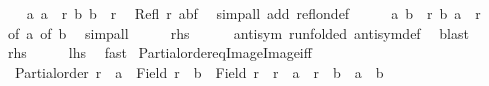 \begin{isabellebody}
\ \ \isamarkupfalse%
\ {\isachardoublequoteopen}{\isacharparenleft}{\kern0pt}a{\isacharcomma}{\kern0pt}\ a{\isacharparenright}{\kern0pt}\ {\isasymin}\ r{\isachardoublequoteclose}\ {\isachardoublequoteopen}{\isacharparenleft}{\kern0pt}b{\isacharcomma}{\kern0pt}\ b{\isacharparenright}{\kern0pt}\ {\isasymin}\ r{\isachardoublequoteclose}\ \isamarkupfalse%
\ {\isacartoucheopen}Refl\ r{\isacartoucheclose}\ abf\ \isamarkupfalse%
\ {\isacharparenleft}{\kern0pt}simp{\isacharunderscore}{\kern0pt}all\ add{\isacharcolon}{\kern0pt}\ refl{\isacharunderscore}{\kern0pt}on{\isacharunderscore}{\kern0pt}def{\isacharparenright}{\kern0pt}\isanewline
\ \ \isamarkupfalse%
\ \isamarkupfalse%
\ {\isachardoublequoteopen}{\isacharparenleft}{\kern0pt}a{\isacharcomma}{\kern0pt}\ b{\isacharparenright}{\kern0pt}\ {\isasymin}\ r{\isachardoublequoteclose}\ {\isachardoublequoteopen}{\isacharparenleft}{\kern0pt}b{\isacharcomma}{\kern0pt}\ a{\isacharparenright}{\kern0pt}\ {\isasymin}\ r{\isachardoublequoteclose}\ \isamarkupfalse%
\ {\isacharasterisk}{\kern0pt}{\isacharbrackleft}{\kern0pt}of\ a{\isacharbrackright}{\kern0pt}\ {\isacharasterisk}{\kern0pt}{\isacharbrackleft}{\kern0pt}of\ b{\isacharbrackright}{\kern0pt}\ \isamarkupfalse%
\ simp{\isacharunderscore}{\kern0pt}all\isanewline
\ \ \isamarkupfalse%
\ \isamarkupfalse%
\ {\isacharquery}{\kern0pt}rhs\isanewline
\ \ \ \ \isamarkupfalse%
\ {\isacartoucheopen}antisym\ r{\isacartoucheclose}{\isacharbrackleft}{\kern0pt}unfolded\ antisym{\isacharunderscore}{\kern0pt}def{\isacharbrackright}{\kern0pt}\ \isamarkupfalse%
\ blast\isanewline
{}\isamarkupfalse%
\isanewline
\ \ \isamarkupfalse%
\ {\isacharquery}{\kern0pt}rhs\isanewline
\ \ \isamarkupfalse%
\ \isamarkupfalse%
\ {\isacharquery}{\kern0pt}lhs\ \isamarkupfalse%
\ fast\isanewline
{}\isamarkupfalse%
%
\endisatagproof
{\isafoldproof}%
%
\isadelimproof
\isanewline
%
\endisadelimproof
\isanewline
{}\isamarkupfalse%
\ Partial{\isacharunderscore}{\kern0pt}order{\isacharunderscore}{\kern0pt}eq{\isacharunderscore}{\kern0pt}Image{}{\isacharunderscore}{\kern0pt}Image{}{\isacharunderscore}{\kern0pt}iff{\isacharcolon}{\kern0pt}\isanewline
\ \ {\isachardoublequoteopen}Partial{\isacharunderscore}{\kern0pt}order\ r\ {\isasymLongrightarrow}\ a\ {\isasymin}\ Field\ r\ {\isasymLongrightarrow}\ b\ {\isasymin}\ Field\ r\ {\isasymLongrightarrow}\ r\ {\isacharbackquote}{\kern0pt}{\isacharbackquote}{\kern0pt}\ {\isacharbraceleft}{\kern0pt}a{\isacharbraceright}{\kern0pt}\ {\isacharequal}{\kern0pt}\ r\ {\isacharbackquote}{\kern0pt}{\isacharbackquote}{\kern0pt}\ {\isacharbraceleft}{\kern0pt}b{\isacharbraceright}{\kern0pt}\ {\isasymlongleftrightarrow}\ a\ {\isacharequal}{\kern0pt}\ b{\isachardoublequoteclose}\isanewline

\end{isabellebody}
